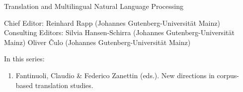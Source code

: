 {\large Translation and Multilingual Natural Language Processing}

\bigskip

Chief Editor: Reinhard Rapp (Johannes Gutenberg-Universität Mainz) \\
Consulting Editors: Silvia Hansen-Schirra (Johannes Gutenberg-Universität Mainz)
Oliver Čulo (Johannes Gutenberg-Universität Mainz)

\bigskip

In this series:

\begin{enumerate}
\item Fantinuoli, Claudio \& Federico Zanettin (eds.). New directions in corpus-based translation studies.
\end{enumerate}